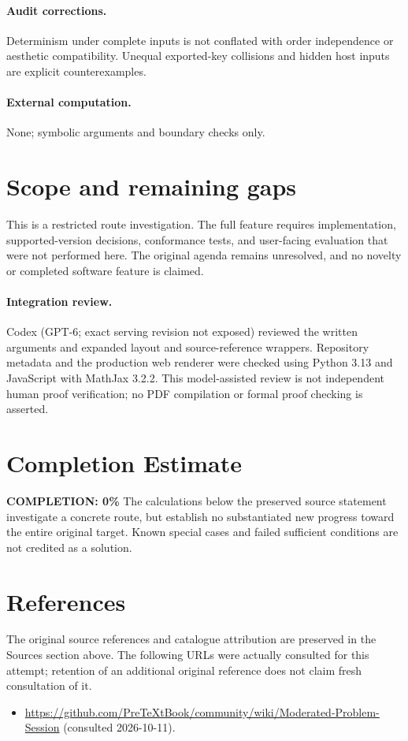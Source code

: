 \documentclass[11pt]{article}
\begin{document}
\paragraph{Audit corrections.} Determinism under complete inputs is not conflated with order independence or aesthetic compatibility. Unequal exported-key collisions and hidden host inputs are explicit counterexamples.
\paragraph{External computation.} None; symbolic arguments and boundary checks only.
\section{Scope and remaining gaps}
This is a restricted route investigation. The full feature requires implementation, supported-version decisions, conformance tests, and user-facing evaluation that were not performed here. The original agenda remains unresolved, and no novelty or completed software feature is claimed.
\paragraph{Integration review.} Codex (GPT-6; exact serving revision not exposed) reviewed the written arguments and expanded layout and source-reference wrappers. Repository metadata and the production web renderer were checked using Python 3.13 and JavaScript with MathJax 3.2.2. This model-assisted review is not independent human proof verification; no PDF compilation or formal proof checking is asserted.

\section{Completion Estimate}
\noindent\textbf{COMPLETION: 0\%}
The calculations below the preserved source statement investigate a concrete route,
but establish no substantiated new progress toward the entire original target.
Known special cases and failed sufficient conditions are not credited as a solution.
\section{References}
The original source references and catalogue attribution are preserved in the
Sources section above. The following URLs were actually consulted for this attempt;
retention of an additional original reference does not claim fresh consultation of it.
\begin{itemize}
\item \url{https://github.com/PreTeXtBook/community/wiki/Moderated-Problem-Session} (consulted 2026-10-11). 
\end{itemize}
\end{document}
